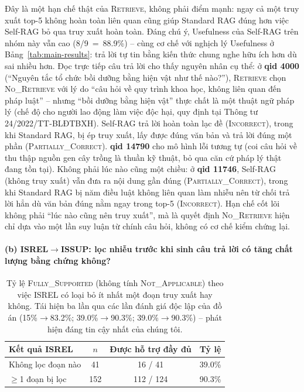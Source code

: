 \documentclass[11pt]{article}
\begin{document}
Đây là một hạn chế thật của \textsc{Retrieve}, không phải điểm mạnh: ngay cả một truy xuất top-5 không hoàn toàn liên quan cũng giúp Standard RAG đúng hơn việc Self-RAG bỏ qua truy xuất hoàn toàn. Đáng chú ý, Usefulness của Self-RAG trên nhóm này vẫn cao (8/9~=~88.9\%) -- cùng cơ chế với nghịch lý Usefulness ở Bảng~\ref{tab:main-results}: trả lời tự tin bằng kiến thức chung nghe hữu ích hơn dù sai nhiều hơn. Đọc trực tiếp câu trả lời cho thấy nguyên nhân cụ thể: ở \textbf{qid 4000} (``Nguyên tắc tổ chức bồi dưỡng bằng hiện vật như thế nào?''), \textsc{Retrieve} chọn \textsc{No\_Retrieve} với lý do ``câu hỏi về quy trình khoa học, không liên quan đến pháp luật'' -- nhưng ``bồi dưỡng bằng hiện vật'' thực chất là một thuật ngữ pháp lý (chế độ cho người lao động làm việc độc hại, quy định tại Thông tư 24/2022/TT-BLĐTBXH). Self-RAG trả lời hoàn toàn lạc đề (\textsc{Incorrect}), trong khi Standard RAG, bị ép truy xuất, lấy được đúng văn bản và trả lời đúng một phần (\textsc{Partially\_Correct}). \textbf{qid 14790} cho mô hình lỗi tương tự (coi câu hỏi về thu thập nguồn gen cây trồng là thuần kỹ thuật, bỏ qua căn cứ pháp lý thật đang tồn tại). Không phải lúc nào cũng một chiều: ở \textbf{qid 11746}, Self-RAG (không truy xuất) vẫn đưa ra nội dung gần đúng (\textsc{Partially\_Correct}), trong khi Standard RAG bị năm điều luật không liên quan làm nhiễu nên từ chối trả lời hẳn dù văn bản đúng nằm ngay trong top-5 (\textsc{Incorrect}). Hạn chế cốt lõi không phải ``lúc nào cũng nên truy xuất'', mà là quyết định \textsc{No\_Retrieve} hiện chỉ dựa vào một lần suy luận từ chính câu hỏi, không có cơ chế kiểm chứng lại.

\paragraph{(b) \textsc{ISREL}$\to$\textsc{ISSUP}: lọc nhiễu trước khi sinh câu trả lời có tăng chất lượng bằng chứng không?}

\begin{table}[t]
\centering
\small
\begin{tabular}{@{}lccc@{}}
\toprule
\textbf{Kết quả \textsc{ISREL}} & \textbf{$n$} & \textbf{Được hỗ trợ đầy đủ} & \textbf{Tỷ lệ} \\
\midrule
Không lọc đoạn nào & 41 & 16 / 41 & 39.0\% \\
$\geq$1 đoạn bị lọc & 152 & 112 / 124 & 90.3\% \\
\bottomrule
\end{tabular}
\caption{Tỷ lệ \textsc{Fully\_Supported} (không tính \textsc{Not\_Applicable}) theo việc \textsc{ISREL} có loại bỏ ít nhất một đoạn truy xuất hay không. Tái hiện ba lần qua các lần đánh giá độc lập của đồ án (15\%$\to$83.2\%; 39.0\%$\to$90.3\%; 39.0\%$\to$90.3\%) -- phát hiện đáng tin cậy nhất của chúng tôi.}
\label{tab:isrel-ablation}
\end{table}
\end{document}
